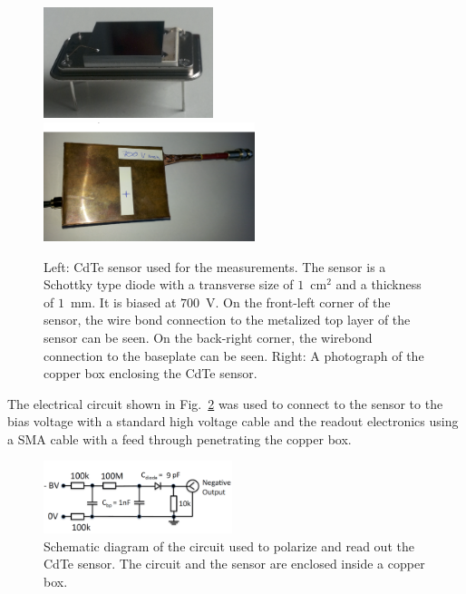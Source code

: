 %
\begin{figure}[htbp] 
\centering
\includegraphics[width=0.44\textwidth]{figures/CdTeSensor.png} 
\includegraphics[width=0.55\textwidth]{figures/CdTeSensorBox.png} 
\caption{Left: CdTe sensor used for the measurements. The sensor is a Schottky type diode with a transverse size 
of $1$~$\mathrm{cm}^{2}$ and a thickness of $1$~mm. It is biased at $700$~V. 
On the front-left corner of the sensor, the wire bond connection
to the metalized top layer of the sensor can be seen. On the back-right corner,
the wirebond connection to the baseplate can be seen. 
Right: A photograph of the copper box enclosing the CdTe sensor. } 
\label{fig:CdTeSensor} 
\end{figure} 
%
The electrical circuit shown in Fig.~\ref{fig:cdtecircuit} was used to connect to the sensor to the bias 
voltage with a standard high voltage cable and the readout electronics using a SMA cable with a feed 
through penetrating the copper box.

%
\begin{figure}[htbp] 
\centering
\includegraphics[width=0.49\textwidth]{figures/circuit_CdTe.png} 
\caption{Schematic diagram of the circuit used to polarize and read out the 
CdTe sensor. The circuit and the sensor are enclosed inside a copper box. }
\label{fig:cdtecircuit} 
\end{figure} 
%
